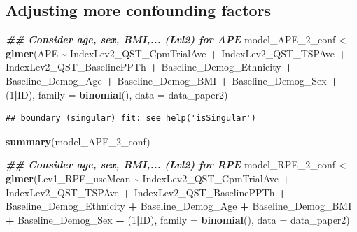 \documentclass[
  12pt,
]{article}
\newenvironment{Shaded}{\begin{snugshade}}{\end{snugshade}}
\newcommand{\AttributeTok}[1]{\textcolor[rgb]{0.13,0.29,0.53}{#1}}
\newcommand{\DecValTok}[1]{\textcolor[rgb]{0.00,0.00,0.81}{#1}}
\newcommand{\DocumentationTok}[1]{\textcolor[rgb]{0.56,0.35,0.01}{\textbf{\textit{#1}}}}
\newcommand{\FunctionTok}[1]{\textcolor[rgb]{0.13,0.29,0.53}{\textbf{#1}}}
\newcommand{\NormalTok}[1]{#1}
\newcommand{\OtherTok}[1]{\textcolor[rgb]{0.56,0.35,0.01}{#1}}
\newcommand{\SpecialCharTok}[1]{\textcolor[rgb]{0.81,0.36,0.00}{\textbf{#1}}}
\begin{document}
\hypertarget{adjusting-more-confounding-factors}{%
\subsection{Adjusting more confounding
factors}\label{adjusting-more-confounding-factors}}

\begin{Shaded}
\begin{Highlighting}[]
\DocumentationTok{\#\# Consider age, sex, BMI,... (Lvl2) for APE}
\NormalTok{model\_APE\_2\_conf }\OtherTok{\textless{}{-}} \FunctionTok{glmer}\NormalTok{(APE }\SpecialCharTok{\textasciitilde{}}\NormalTok{ IndexLev2\_QST\_CpmTrialAve }\SpecialCharTok{+}\NormalTok{ IndexLev2\_QST\_TSPAve }\SpecialCharTok{+}\NormalTok{ IndexLev2\_QST\_BaselinePPTh }\SpecialCharTok{+}\NormalTok{ Baseline\_Demog\_Ethnicity }\SpecialCharTok{+}\NormalTok{ Baseline\_Demog\_Age }\SpecialCharTok{+}\NormalTok{ Baseline\_Demog\_BMI }\SpecialCharTok{+}\NormalTok{ Baseline\_Demog\_Sex }\SpecialCharTok{+}\NormalTok{ (}\DecValTok{1}\SpecialCharTok{|}\NormalTok{ID), }\AttributeTok{family =} \FunctionTok{binomial}\NormalTok{(), }\AttributeTok{data =}\NormalTok{ data\_paper2)}
\end{Highlighting}
\end{Shaded}

\begin{verbatim}
## boundary (singular) fit: see help('isSingular')
\end{verbatim}

\begin{Shaded}
\begin{Highlighting}[]
\FunctionTok{summary}\NormalTok{(model\_APE\_2\_conf)}

\DocumentationTok{\#\# Consider age, sex, BMI,... (Lvl2) for RPE}
\NormalTok{model\_RPE\_2\_conf }\OtherTok{\textless{}{-}} \FunctionTok{glmer}\NormalTok{(Lev1\_RPE\_useMean }\SpecialCharTok{\textasciitilde{}}\NormalTok{ IndexLev2\_QST\_CpmTrialAve }\SpecialCharTok{+}\NormalTok{ IndexLev2\_QST\_TSPAve }\SpecialCharTok{+}\NormalTok{ IndexLev2\_QST\_BaselinePPTh }\SpecialCharTok{+}\NormalTok{ Baseline\_Demog\_Ethnicity }\SpecialCharTok{+}\NormalTok{ Baseline\_Demog\_Age }\SpecialCharTok{+}\NormalTok{ Baseline\_Demog\_BMI }\SpecialCharTok{+}\NormalTok{ Baseline\_Demog\_Sex }\SpecialCharTok{+}\NormalTok{ (}\DecValTok{1}\SpecialCharTok{|}\NormalTok{ID), }\AttributeTok{family =} \FunctionTok{binomial}\NormalTok{(), }\AttributeTok{data =}\NormalTok{ data\_paper2)}
\end{Highlighting}
\end{Shaded}
\end{document}
